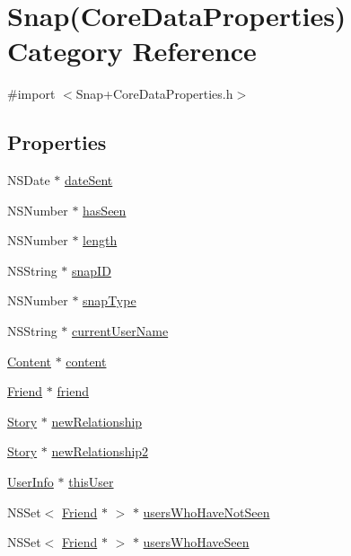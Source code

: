 \hypertarget{category_snap_07_core_data_properties_08}{}\section{Snap(Core\+Data\+Properties) Category Reference}
\label{category_snap_07_core_data_properties_08}


{\ttfamily \#import $<$Snap+\+Core\+Data\+Properties.\+h$>$}

\subsection*{Properties}
\begin{DoxyCompactItemize}
\item 
N\+S\+Date $\ast$ \hyperlink{category_snap_07_core_data_properties_08_a6691bfaebad4a5f85af2f2c81e182f73}{date\+Sent}
\item 
N\+S\+Number $\ast$ \hyperlink{category_snap_07_core_data_properties_08_ad7829a84e4fcd6dfc59187e925abf540}{has\+Seen}
\item 
N\+S\+Number $\ast$ \hyperlink{category_snap_07_core_data_properties_08_a71a054402e878feacaed0d6e41c70b74}{length}
\item 
N\+S\+String $\ast$ \hyperlink{category_snap_07_core_data_properties_08_ab9069d8e721ed8ce39c12b2591f99833}{snap\+ID}
\item 
N\+S\+Number $\ast$ \hyperlink{category_snap_07_core_data_properties_08_a68257cdbdfeb886f662b217a2d4cadf9}{snap\+Type}
\item 
N\+S\+String $\ast$ \hyperlink{category_snap_07_core_data_properties_08_a8e1375330a30756e65bda38b1621add1}{current\+User\+Name}
\item 
\hyperlink{interface_content}{Content} $\ast$ \hyperlink{category_snap_07_core_data_properties_08_aab265bdb30bcc6e7e7959c873de35446}{content}
\item 
\hyperlink{interface_friend}{Friend} $\ast$ \hyperlink{category_snap_07_core_data_properties_08_ad610ad587979481aa2ea6f6a917a0bfa}{friend}
\item 
\hyperlink{interface_story}{Story} $\ast$ \hyperlink{category_snap_07_core_data_properties_08_a53885a2a1b43f35ae0585d1bd0dc1991}{new\+Relationship}
\item 
\hyperlink{interface_story}{Story} $\ast$ \hyperlink{category_snap_07_core_data_properties_08_a255d69bfefa15984bfb544521bed2178}{new\+Relationship2}
\item 
\hyperlink{interface_user_info}{User\+Info} $\ast$ \hyperlink{category_snap_07_core_data_properties_08_a0dd784f55f0e861a4270f6546470f8bd}{this\+User}
\item 
N\+S\+Set$<$ \hyperlink{interface_friend}{Friend} $\ast$ $>$ $\ast$ \hyperlink{category_snap_07_core_data_properties_08_a29505408f6f861f86ed6ab15807e3e70}{users\+Who\+Have\+Not\+Seen}
\item 
N\+S\+Set$<$ \hyperlink{interface_friend}{Friend} $\ast$ $>$ $\ast$ \hyperlink{category_snap_07_core_data_properties_08_ad7eed44d77fe25a4721f170f1a526133}{users\+Who\+Have\+Seen}
\end{DoxyCompactItemize}



